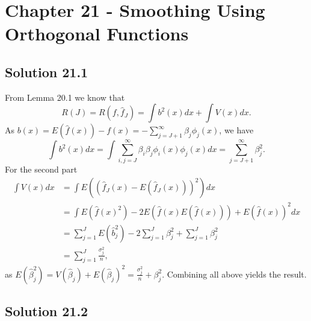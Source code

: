 \section*{Chapter 21 - Smoothing Using Orthogonal Functions}

\subsection*{Solution 21.1}

From Lemma 20.1 we know that
\begin{equation*}
    R(J) = R(f, \hat{f}_J)
        = \int b^2(x) dx + \int V(x) dx.
\end{equation*}
As $b(x) = E(\hat{f}(x)) - f(x) = - \sum_{j = J + 1}^{\infty} \beta_j \phi_j(x)$, we have
\begin{equation*}
    \int b^2(x) dx = \int \sum_{i, j = J}^{\infty} \beta_i \beta_j \phi_i(x) \phi_j(x) dx
        = \sum_{j = J + 1}^{\infty} \beta_j^2.
\end{equation*}
For the second part
\begin{equation*}
    \begin{split}
        \int V(x) dx &= \int E((\hat{f}_J(x) - E(\hat{f}_J(x)))^2) dx \\
            &= \int E(\hat{f}(x)^2) - 2E(\hat{f}(x)E(\hat{f}(x))) + E(\hat{f}(x))^2 dx \\
            &= \sum_{j = 1}^J E(\hat{b}_j^2) - 2\sum_{j = 1}^J \beta_j^2 + \sum_{j = 1}^J \beta_j^2 \\
            &= \sum_{j = 1}^J \frac{\sigma_j^2}{n},
    \end{split}
\end{equation*}
as $E(\hat{\beta}_j^2) = V(\hat{\beta}_j) + E(\hat{\beta}_j)^2 = \frac{\sigma_j^2}{n} + \beta_j^2$.
Combining all above yields the result.


\subsection*{Solution 21.2}

